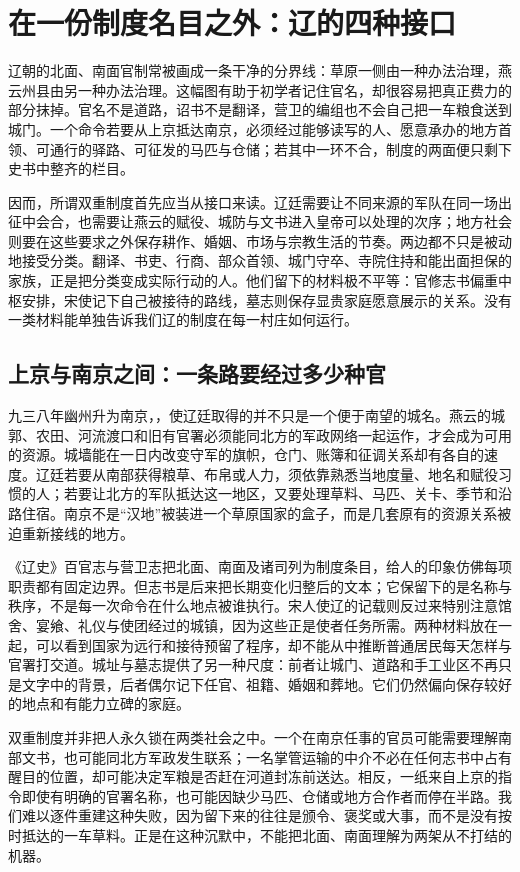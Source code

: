 \section{在一份制度名目之外：辽的四种接口}

辽朝的北面、南面官制常被画成一条干净的分界线：草原一侧由一种办法治理，燕云州县由另一种办法治理。这幅图有助于初学者记住官名，却很容易把真正费力的部分抹掉。官名不是道路，诏书不是翻译，营卫的编组也不会自己把一车粮食送到城门。一个命令若要从上京抵达南京，必须经过能够读写的人、愿意承办的地方首领、可通行的驿路、可征发的马匹与仓储；若其中一环不合，制度的两面便只剩下史书中整齐的栏目。

因而，所谓双重制度首先应当从接口来读。辽廷需要让不同来源的军队在同一场出征中会合，也需要让燕云的赋役、城防与文书进入皇帝可以处理的次序；地方社会则要在这些要求之外保存耕作、婚姻、市场与宗教生活的节奏。两边都不只是被动地接受分类。翻译、书吏、行商、部众首领、城门守卒、寺院住持和能出面担保的家族，正是把分类变成实际行动的人。他们留下的材料极不平等：官修志书偏重中枢安排，宋使记下自己被接待的路线，墓志则保存显贵家庭愿意展示的关系。没有一类材料能单独告诉我们辽的制度在每一村庄如何运行。

\subsection{上京与南京之间：一条路要经过多少种官}

九三八年幽州升为南京，，使辽廷取得的并不只是一个便于南望的城名。燕云的城郭、农田、河流渡口和旧有官署必须能同北方的军政网络一起运作，才会成为可用的资源。城墙能在一日内改变守军的旗帜，仓门、账簿和征调关系却有各自的速度。辽廷若要从南部获得粮草、布帛或人力，须依靠熟悉当地度量、地名和赋役习惯的人；若要让北方的军队抵达这一地区，又要处理草料、马匹、关卡、季节和沿路住宿。南京不是“汉地”被装进一个草原国家的盒子，而是几套原有的资源关系被迫重新接线的地方。

《辽史》百官志与营卫志把北面、南面及诸司列为制度条目，给人的印象仿佛每项职责都有固定边界。但志书是后来把长期变化归整后的文本；它保留下的是名称与秩序，不是每一次命令在什么地点被谁执行。宋人使辽的记载则反过来特别注意馆舍、宴飨、礼仪与使团经过的城镇，因为这些正是使者任务所需。两种材料放在一起，可以看到国家为远行和接待预留了程序，却不能从中推断普通居民每天怎样与官署打交道。城址与墓志提供了另一种尺度：前者让城门、道路和手工业区不再只是文字中的背景，后者偶尔记下任官、祖籍、婚姻和葬地。它们仍然偏向保存较好的地点和有能力立碑的家庭。

双重制度并非把人永久锁在两类社会之中。一个在南京任事的官员可能需要理解南部文书，也可能同北方军政发生联系；一名掌管运输的中介不必在任何志书中占有醒目的位置，却可能决定军粮是否赶在河道封冻前送达。相反，一纸来自上京的指令即使有明确的官署名称，也可能因缺少马匹、仓储或地方合作者而停在半路。我们难以逐件重建这种失败，因为留下来的往往是颁令、褒奖或大事，而不是没有按时抵达的一车草料。正是在这种沉默中，不能把北面、南面理解为两架从不打结的机器。

